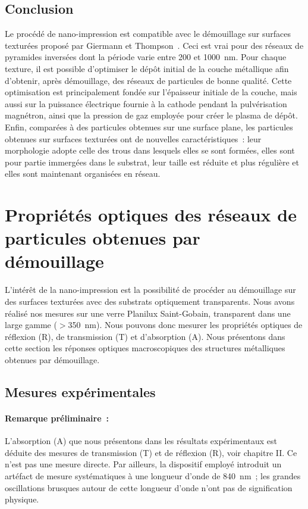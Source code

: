 \subsection{Conclusion}
Le procédé de nano-impression est compatible avec le démouillage sur surfaces texturées proposé par Giermann et Thompson~\cite{giermann2005solid}. Ceci est vrai pour des réseaux de pyramides inversées dont la période varie entre 200 et 1000~nm. Pour chaque texture, il est possible d'optimiser le dépôt initial de la couche métallique afin d'obtenir, après démouillage, des réseaux de particules de bonne qualité. Cette optimisation est principalement fondée sur l'épaisseur initiale de la couche, mais aussi sur la puissance électrique fournie à la cathode pendant la pulvérisation magnétron, ainsi que la pression de gaz employée pour créer le plasma de dépôt. Enfin, comparées à des particules obtenues sur une surface plane, les particules obtenues sur surfaces texturées ont de nouvelles caractéristiques~: leur morphologie adopte celle des trous dans lesquels elles se sont formées, elles sont pour partie immergées dans le substrat, leur taille est réduite et plus régulière et elles sont maintenant organisées en réseau.\par 

\section[Propriétés optiques des réseaux de particules ]{Propriétés optiques des réseaux de particules obtenues par démouillage}
L'intérêt de la nano-impression est la possibilité de procéder au démouillage sur des surfaces texturées avec des substrats optiquement transparents. Nous avons réalisé nos mesures sur une verre Planilux Saint-Gobain, transparent dans une large gamme ($>$350~nm). Nous pouvons donc mesurer les propriétés optiques de réflexion (R), de transmission (T) et d'absorption (A). Nous présentons dans cette section les réponses optiques macroscopiques des structures métalliques obtenues par démouillage.\par 

\subsection{Mesures expérimentales}
\paragraph*{Remarque préliminaire~:} L'absorption (A) que nous présentons dans les résultats expérimentaux est déduite des mesures de transmission (T) et de réflexion (R), voir chapitre II. Ce n'est pas une mesure directe. Par ailleurs, la dispositif employé introduit un artéfact de mesure systématiques à une longueur d'onde de 840~nm~; les grandes oscillations brusques autour de cette longueur d'onde n'ont pas de signification physique.\par 

